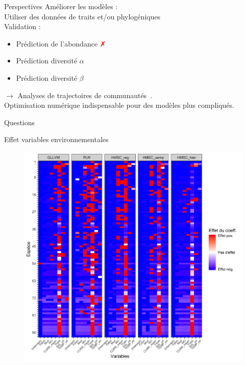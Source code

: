\documentclass[%
]{beamer}
\begin{document}
	\begin{frame}{Perspectives}
	Améliorer les modèles :\vspace{\baselineskip}\\
	Utiliser des données de traits et/ou phylogéniques\pause\vspace{\baselineskip}\\
	Validation :
	\begin{itemize}
		\item Prédiction de l'abondance \textcolor{red}{\faClose}
		\item Prédiction diversité $\alpha$ \textcolor{green}{\faCheckSquare}
		\item Prédiction diversité $\beta$ \textcolor{blue}{\faQuestionCircle}
	\end{itemize}
	$\rightarrow$ Analyses de trajectoires de communautés~\citep{De_Caceres_2019}.\pause\vspace{\baselineskip}\\
	Optimisation numérique indispensable pour des modèles plus compliqués.
	\end{frame}
	
	\appendix
	
	\begin{frame}[standout]
		Questions
	\end{frame}
	
	\begin{frame}{Effet variables environnementales}
		\begin{figure}[t]
		\begin{center}
			\includegraphics[scale =0.09]{figs/effect_env.png}%
		\end{center}
	\end{figure}
	\end{frame}
	
\end{document}
